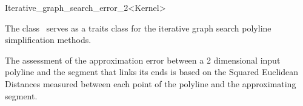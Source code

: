 
\begin{ccRefClass}{Iterative_graph_search_error_2<Kernel>}

\ccDefinition
  
The class \ccRefName\ serves as a traits class for the iterative graph search 
polyline simplification methods.

The assessment of the approximation error between a 2 dimensional input polyline and
the segment that links its ends is based on the Squared Euclidean
Distances measured between each point of the polyline and the
approximating segment.







\ccIsModel



\ccTypes
{}
\ccOperations


\ccSeeAlso


\end{ccRefClass}

